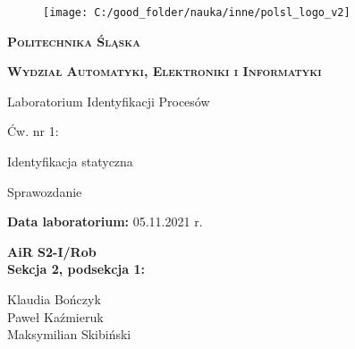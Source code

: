 \documentclass[11pt, a4paper]{article}
\begin{document}

\begin{titlepage}
{\LARGE
\begin{center}
	\begin{figure}[h!]
		\centering
		\texttt{[image: C:/good\_folder/nauka/inne/polsl\_logo\_v2]}
	\end{figure}
	
	\vspace{0.25cm}
	
	\textbf{\textsc{Politechnika Śląska}}
	
	\textbf{\textsc{Wydział Automatyki, Elektroniki i Informatyki}}
	
	\vspace{1.5cm}
	
	Laboratorium Identyfikacji Procesów
	
	\vspace{1.5cm}
	
	Ćw. nr 1:
	
	Identyfikacja statyczna
	
	\vspace{0.5cm}
	
	Sprawozdanie
\end{center}
}

\vfill

{\Large
\noindent
\textbf{Data laboratorium:} 05.11.2021 r.

\vspace{0.5cm}

\noindent
\textbf{AiR S2-I/Rob}\\
\textbf{Sekcja 2, podsekcja 1:}

\noindent
\hspace*{0.5cm} Klaudia Bończyk\\
\hspace*{0.5cm} Paweł Kaźmieruk\\
\hspace*{0.5cm} Maksymilian Skibiński\\


\vspace{0.5cm}
}

\begin{center}
\end{center}
\end{titlepage}

\setcounter{page}{2}
\end{document}
